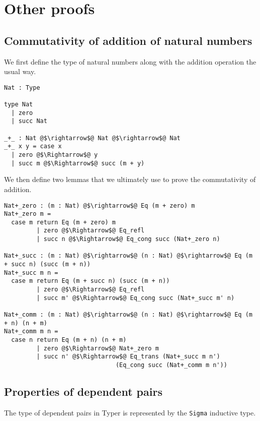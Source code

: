 \documentclass[12pt,twoside,maitrise]{dms}
\theoremstyle{definition}
\numberwithin{equation}{section}
\numberwithin{table}{chapter}
\numberwithin{figure}{chapter}
\newcommand\id[1] {\texttt{#1}}
\begin{document}
\chapter{Other proofs}\label{app:other-proofs}

\section{Commutativity of addition of natural numbers}

We first define the type of natural numbers along with the addition operation
the usual way.

\begin{verbatim}
Nat : Type

type Nat
  | zero
  | succ Nat

_+_ : Nat @$\rightarrow$@ Nat @$\rightarrow$@ Nat
_+_ x y = case x
  | zero @$\Rightarrow$@ y
  | succ m @$\Rightarrow$@ succ (m + y)
\end{verbatim}

We then define two lemmas that we ultimately use to prove the commutativity of
addition.

\begin{verbatim}
Nat+_zero : (m : Nat) @$\rightarrow$@ Eq (m + zero) m
Nat+_zero m =
  case m return Eq (m + zero) m
         | zero @$\Rightarrow$@ Eq_refl
         | succ n @$\Rightarrow$@ Eq_cong succ (Nat+_zero n)

Nat+_succ : (m : Nat) @$\rightarrow$@ (n : Nat) @$\rightarrow$@ Eq (m + succ n) (succ (m + n))
Nat+_succ m n =
  case m return Eq (m + succ n) (succ (m + n))
         | zero @$\Rightarrow$@ Eq_refl
         | succ m' @$\Rightarrow$@ Eq_cong succ (Nat+_succ m' n)

Nat+_comm : (m : Nat) @$\rightarrow$@ (n : Nat) @$\rightarrow$@ Eq (m + n) (n + m)
Nat+_comm m n =
  case n return Eq (m + n) (n + m)
         | zero @$\Rightarrow$@ Nat+_zero m
         | succ n' @$\Rightarrow$@ Eq_trans (Nat+_succ m n')
                               (Eq_cong succ (Nat+_comm m n'))
\end{verbatim}


\section{Properties of dependent pairs}\label{app:deppairs-properties}
The type of dependent pairs in Typer is represented by the \id{Sigma} inductive
type.
\end{document}
